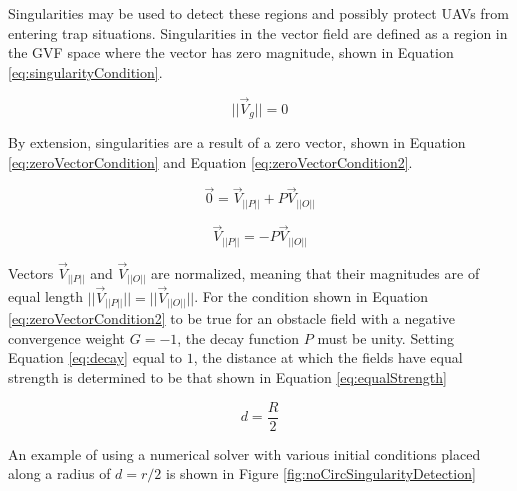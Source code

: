 \documentclass[numbered,pdftex]{ohio-etd}
\begin{document}
 Singularities may be used to detect these regions and possibly protect UAVs from entering trap situations. Singularities in the vector field are defined as a region in the GVF space where the vector has zero magnitude, shown in Equation \ref{eq:singularityCondition}.


\begin{equation}
\label{eq:singularityCondition}
||\overrightarrow{V}_g || = 0
\end{equation}

\noindent
By extension, singularities are a result of a zero vector, shown in Equation \ref{eq:zeroVectorCondition} and Equation \ref{eq:zeroVectorCondition2}.



\begin{equation}
\label{eq:zeroVectorCondition}
\overrightarrow{0} = \overrightarrow{V}_{||P||} +P\overrightarrow{V}_{||O||}
\end{equation}

\begin{equation}
\label{eq:zeroVectorCondition2}
\overrightarrow{V}_{||P||}=-P\overrightarrow{V}_{||O||}
\end{equation}

Vectors $\overrightarrow{V}_{||P||}$ and $\overrightarrow{V}_{||O||}$ are normalized, meaning that their magnitudes are of equal length $||\overrightarrow{V}_{||P||}||=||\overrightarrow{V}_{||O||}||$. For the condition shown in Equation \ref{eq:zeroVectorCondition2} to be true for an obstacle field with a negative convergence weight $G=-1$, the decay function $P$ must be unity. Setting Equation \ref{eq:decay} equal to $1$, the distance at which the fields have equal strength is determined to be that shown in Equation \ref{eq:equalStrength}

\begin{equation}
\label{eq:equalStrength}
d = \frac{R}{2}
\end{equation}

An example of using a numerical solver with various initial conditions placed along a radius of $d=r/2$ is shown in Figure \ref{fig:noCircSingularityDetection}
\end{document}
